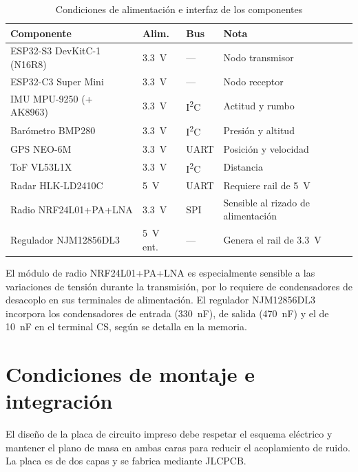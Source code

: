 \begin{table}[H]
    \centering
    \caption{Condiciones de alimentación e interfaz de los componentes}
    \label{tab:pliego_componentes}
    \begin{tabularx}{\linewidth}{l l l X}
        \toprule
        \textbf{Componente} & \textbf{Alim.} & \textbf{Bus} & \textbf{Nota} \\
        \midrule
        ESP32-S3 DevKitC-1 (N16R8) & \SI{3.3}{\volt} & --- & Nodo transmisor \\
        ESP32-C3 Super Mini & \SI{3.3}{\volt} & --- & Nodo receptor \\
        IMU MPU-9250 (+ AK8963) & \SI{3.3}{\volt} & I\textsuperscript{2}C & Actitud y rumbo \\
        Barómetro BMP280 & \SI{3.3}{\volt} & I\textsuperscript{2}C & Presión y altitud \\
        GPS NEO-6M & \SI{3.3}{\volt} & UART & Posición y velocidad \\
        ToF VL53L1X & \SI{3.3}{\volt} & I\textsuperscript{2}C & Distancia \\
        Radar HLK-LD2410C & \SI{5}{\volt} & UART & Requiere rail de \SI{5}{\volt} \\
        Radio NRF24L01+PA+LNA & \SI{3.3}{\volt} & SPI & Sensible al rizado de alimentación \\
        Regulador NJM12856DL3 & \SI{5}{\volt} ent. & --- & Genera el rail de \SI{3.3}{\volt} \\
        \bottomrule
    \end{tabularx}
\end{table}

El módulo de radio NRF24L01+PA+LNA es especialmente sensible a las variaciones de tensión durante la transmisión, por lo requiere de condensadores de desacoplo en sus terminales de alimentación. El regulador NJM12856DL3 incorpora los condensadores de entrada (\SI{330}{\nano\farad}), de salida (\SI{470}{\nano\farad}) y el de \SI{10}{\nano\farad} en el terminal CS, según se detalla en la memoria.


\chapter{Condiciones de montaje e integración}
\label{ch:pliego_montaje}

El diseño de la placa de circuito impreso debe respetar el esquema eléctrico y mantener el plano de masa en ambas caras para reducir el acoplamiento de ruido. La placa es de dos capas y se fabrica mediante JLCPCB.

